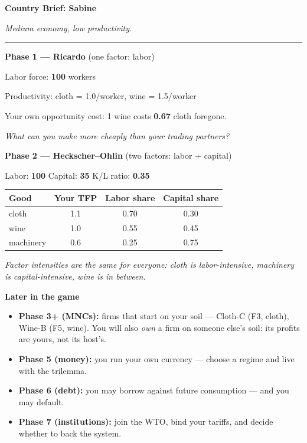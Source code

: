 \documentclass[11pt]{article}
\newcommand{\hr}{\par\vspace{2pt}\noindent\rule{\linewidth}{0.4pt}\par\vspace{2pt}}
\begin{document}
{\Large\bfseries Country Brief: Sabine}\par
\textit{Medium economy, low productivity.}
\hr

{\bfseries Phase 1 --- Ricardo} \hfill (one factor: labor)\par
Labor force: \textbf{100} workers\par
Productivity: cloth = 1.0/worker, wine = 1.5/worker\par
Your own opportunity cost: 1 wine costs \textbf{0.67} cloth foregone.\par
\textit{What can you make more cheaply than your trading partners?}

\vspace{6pt}
{\bfseries Phase 2 --- Heckscher--Ohlin} \hfill (two factors: labor + capital)\par
Labor: \textbf{100} \quad Capital: \textbf{35} \quad K/L ratio: \textbf{0.35}\par
\vspace{2pt}
\begin{tabular}{lccc}
\toprule
Good & Your TFP & Labor share & Capital share \\
\midrule
    cloth & 1.1 & 0.70 & 0.30 \\
    wine & 1.0 & 0.55 & 0.45 \\
    machinery & 0.6 & 0.25 & 0.75 \\
\bottomrule
\end{tabular}\par
\vspace{2pt}
\textit{Factor intensities are the same for everyone: cloth is labor-intensive,
machinery is capital-intensive, wine is in between.}

\vspace{6pt}
{\bfseries Later in the game}\par
\begin{itemize}[nosep,leftmargin=1.4em]
  \item \textbf{Phase 3+ (MNCs):} firms that start on your soil --- Cloth-C (F3, cloth), Wine-B (F5, wine).
    You will also \emph{own} a firm on someone else's soil: its profits are
    yours, not its host's.
  \item \textbf{Phase 5 (money):} you run your own currency --- choose a regime and live with the trilemma.
  \item \textbf{Phase 6 (debt):} you may borrow against future consumption --- and you may default.
  \item \textbf{Phase 7 (institutions):} join the WTO, bind your tariffs, and decide whether to back the system.
\end{itemize}
\end{document}
